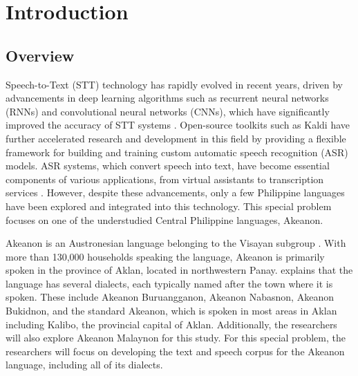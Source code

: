 \chapter{Introduction}
\label{sec:researchdesc}    %

\section{Overview}
\label{sec:overview}

Speech-to-Text (STT) technology has rapidly evolved in recent years, driven by advancements in deep learning algorithms such as recurrent neural networks (RNNs) and convolutional neural networks (CNNs), which have significantly improved the accuracy of STT systems \cite{Televic:2024}. Open-source toolkits such as Kaldi have further accelerated research and development in this field by providing a flexible framework for building and training custom automatic speech recognition (ASR) models. ASR systems, which convert speech into text, have become essential components of various applications, from virtual assistants to transcription services . However, despite these advancements, only a few Philippine languages have been explored and integrated into this technology. This special problem focuses on one of the understudied \cite{Wellstood:2022} Central Philippine languages, Akeanon. 

Akeanon is an Austronesian language belonging to the Visayan subgroup \cite{Biray:2023}. With more than 130,000 households \cite{PSA:2023} speaking the language, Akeanon is primarily spoken in the province of Aklan, located in northwestern Panay.  explains that the language has several dialects, each typically named after the town where it is spoken. These include Akeanon Buruangganon, Akeanon Nabasnon, Akeanon Bukidnon, and the standard Akeanon, which is spoken in most areas in Aklan including Kalibo, the provincial capital of Aklan. Additionally, the researchers will also explore Akeanon Malaynon for this study. For this special problem, the researchers will focus on developing the text and speech corpus for the Akeanon language, including all of its dialects.

